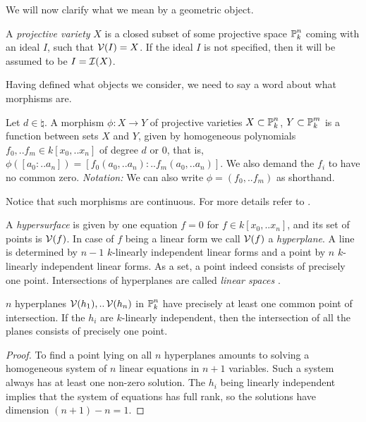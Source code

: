 We will now clarify what we mean by a geometric object.
\begin{definition}
A \emph{projective variety} $X$ is a closed subset of some projective space $\operatorname{\mathbb P}^n_k$ coming with an ideal $I$, such that $\operatorname{\mathcal V}(I) = X$.
If the ideal $I$ is not specified, then it will be assumed to be $I=\operatorname{\mathcal I}(X)$.
\end{definition}
Having defined what objects we consider, we need to say a word about what morphisms are.
\begin{definition}
Let $d \in \natural$.
A morphism $\phi : X \to Y$ of projective varieties $X \subset \operatorname{\mathbb P}^n_k$, $Y \subset \operatorname{\mathbb P}^m_k$ is a function between sets $X$ and $Y$,
given by homogeneous polynomials $f_0,..f_m \in k[x_0,..x_n]$ of degree $d$ or 0, that is, $\phi([a_0:..a_n]) = [f_0(a_0,..a_n):..f_m(a_0,..a_n)]$.
We also demand the $f_i$ to have no common zero. \emph{Notation:} We can also write $\phi = (f_0,..f_m)$ as shorthand.
\end{definition}
Notice that such morphisms are continuous.
For more details refer to \cite[part I, lecture 1]{harris1992algebraic}.

\begin{example}
A \emph{hypersurface} is given by one equation $f=0$ for $f\in k[x_0,..x_n]$, and its set of points is $\operatorname{\mathcal V}(f)$.
In case of $f$ being a linear form we call $\operatorname{\mathcal V}(f)$ a \emph{hyperplane}.
A line is determined by $n-1$ $k$-linearly independent linear forms and a point by $n$ $k$-linearly independent linear forms.
As a set, a point indeed consists of precisely one point.
Intersections of hyperplanes are called \emph{linear spaces} \cite[example 1.1]{harris1992algebraic}.
\end{example}

\begin{proposition} $n$ hyperplanes $\operatorname{\mathcal V}(h_1),..\operatorname{\mathcal V}(h_n)$ in $\operatorname{\mathbb P}^n_k$ have precisely at least one common point of intersection.
If the $h_i$ are $k$-linearly independent, then the intersection of all the planes consists of precisely one point.
\end{proposition}
\begin{proof}
To find a point lying on all $n$ hyperplanes amounts to solving a homogeneous system of $n$ linear equations in $n+1$ variables.
Such a system always has at least one non-zero solution.
The $h_i$ being linearly independent implies that the system of equations has full rank, so the solutions have dimension $(n+1) - n = 1$.
\end{proof}

